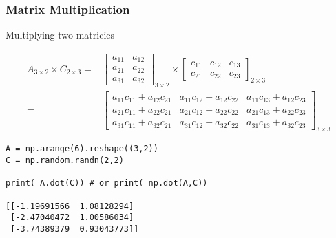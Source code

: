  \begin{frame}[fragile] \frametitle{Matrix Multiplication}

Multiplying two matricies


\begin{align}
    A_{3 \times 2} \times C_{2 \times 3}=&
    \begin{bmatrix}
      a_{11} & a_{12} \\
      a_{21} & a_{22} \\
      a_{31} & a_{32}   
    \end{bmatrix}_{3 \times 2}
    \times
    \begin{bmatrix}
      c_{11} & c_{12} & c_{13} \\
      c_{21} & c_{22} & c_{23} 
    \end{bmatrix}_{2 \times 3} \\
    =&
    \begin{bmatrix}
      a_{11} c_{11}+a_{12} c_{21} & a_{11} c_{12}+a_{12} c_{22} & a_{11} c_{13}+a_{12} c_{23} \\
      a_{21} c_{11}+a_{22} c_{21} & a_{21} c_{12}+a_{22} c_{22} & a_{21} c_{13}+a_{22} c_{23} \\
      a_{31} c_{11}+a_{32} c_{21} & a_{31} c_{12}+a_{32} c_{22} & a_{31} c_{13}+a_{32} c_{23}
    \end{bmatrix}_{3 \times 3}  
\end{align}

\begin{lstlisting}
A = np.arange(6).reshape((3,2))
C = np.random.randn(2,2)

print( A.dot(C)) # or print( np.dot(A,C))

[[-1.19691566  1.08128294]
 [-2.47040472  1.00586034]
 [-3.74389379  0.93043773]]
\end{lstlisting}

\end{frame}

